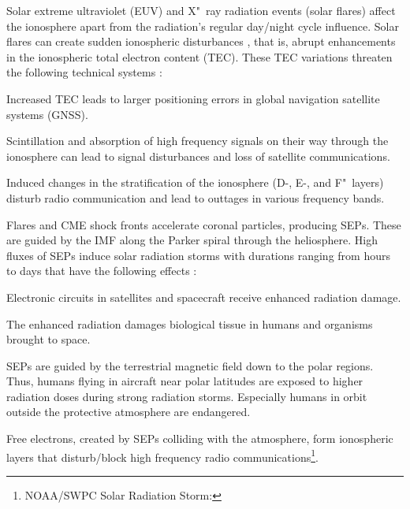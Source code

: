 Solar extreme ultraviolet (EUV) and X"~ray radiation events (solar flares) affect the ionosphere apart from the radiation's regular day/night cycle influence. Solar flares can create sudden ionospheric disturbances \citep{Gosling1993}, that is, abrupt enhancements in the ionospheric total electron content (TEC). These TEC variations threaten the following technical systems \citep{Kraaikamp2015}:
\begin{itemize*}
	\item Increased TEC leads to larger positioning errors in global navigation satellite systems (GNSS).
	\item Scintillation and absorption of high frequency signals on their way through the ionosphere can lead to signal disturbances and loss of satellite communications.
	\item Induced changes in the stratification of the ionosphere (D-, E-, and F"~layers) disturb radio communication and lead to outtages in various frequency bands.
\end{itemize*}

Flares and CME shock fronts accelerate coronal particles, producing SEPs. These are guided by the IMF along the Parker spiral through the heliosphere. High fluxes of SEPs induce solar radiation storms with durations ranging from hours to days that have the following effects \citep{Bothmer2007}:
\begin{itemize*}
	\item Electronic circuits in satellites and spacecraft receive enhanced radiation damage.
	\item The enhanced radiation damages biological tissue in humans and organisms brought to space.
	\item SEPs are guided by the terrestrial magnetic field down to the polar regions. Thus, humans flying in aircraft near polar latitudes are exposed to higher radiation doses during strong radiation storms. Especially humans in orbit outside the protective atmosphere are endangered.
	\item Free electrons, created by SEPs colliding with the atmosphere, form ionospheric layers that disturb/block high frequency radio communications\footnote{NOAA/SWPC Solar Radiation Storm: }.
\end{itemize*}

